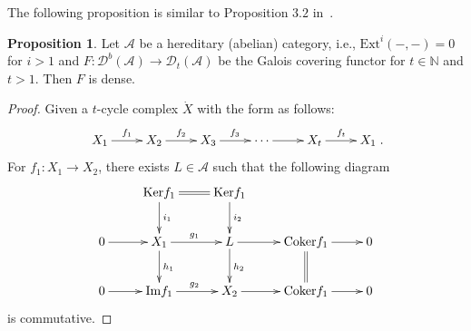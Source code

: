 \documentclass{amsart}
\theoremstyle{definition}
\newtheorem{Prop}[theorem]{Proposition}
\numberwithin{equation}{section}
\begin{document}
The following proposition is similar to Proposition $3.2$
in~\cite{LP}.
\begin{Prop}\label{indecomposable}
Let $\mathcal{A}$ be a hereditary (abelian) category, i.e.,
$\mathrm{Ext}^i(-, -)=0$ for $i>1$ and $F:
{{\mathcal{D}}}^b(\mathcal{A})\rightarrow {{\mathcal{D}}}_t(\mathcal{A})$ be the Galois
covering functor for $t\in{{\mathbb N}}$ and $t>1$. Then $F$ is dense.
\end{Prop}
\begin{proof}
Given a $t$-cycle complex $\dot{X}$ with the form as follows:
$$\xymatrix{X_1\ar[r]^{f_1}&X_2\ar[r]^{f_2}&X_3\ar[r]^{f_3}&\cdots\ar[r]&X_{t}\ar[r]^{f_t}&X_1}.$$
For $f_1: X_1\rightarrow X_2$, there exists $L\in \mathcal{A}$ such
that the following diagram
$$
\xymatrix{&\mathrm{Ker}f_1\ar@{=}[r]\ar[d]^{i_1}&\mathrm{Ker}f_1\ar[d]^{i_2}&&\\
0\ar[r]&X_1\ar[r]^{g_1}\ar[d]^{h_1}&L\ar[r]\ar[d]^{h_2}&\mathrm{Coker}f_1\ar[r]\ar@{=}[d]&0\\
0\ar[r]&\mathrm{Im}f_1\ar[r]^{g_2}&X_2\ar[r]&\mathrm{Coker}f_1\ar[r]&0}
$$
is commutative.


\end{proof}
\end{document}
